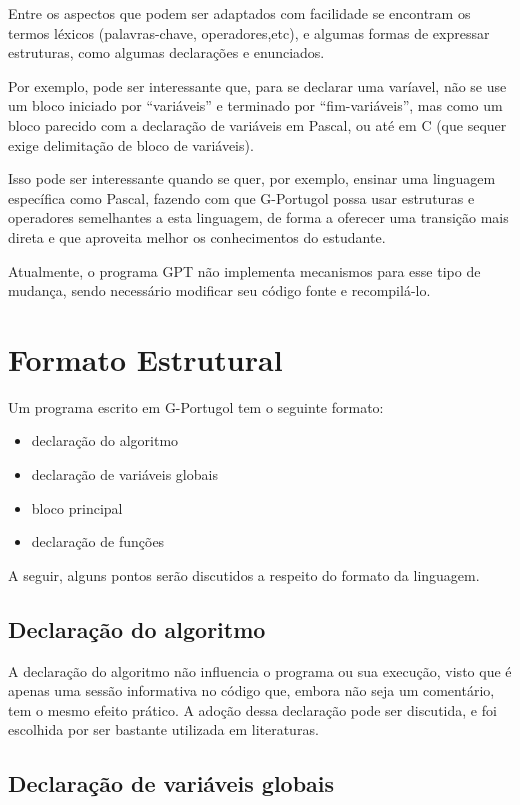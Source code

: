 \documentclass[a4paper,11pt]{report}
\begin{document}
Entre os aspectos que podem ser adaptados com facilidade se encontram os termos
léxicos (palavras-chave, operadores,etc), e algumas formas de expressar
estruturas, como algumas declarações e enunciados.

Por exemplo, pode ser interessante que, para se declarar uma varíavel, não se
use um bloco iniciado por ``variáveis'' e terminado por ``fim-variáveis'', mas
como um bloco parecido com a declaração de variáveis em Pascal, ou até em C (que
sequer exige delimitação de bloco de variáveis).

Isso pode ser interessante quando se quer, por exemplo, ensinar uma linguagem
específica como Pascal, fazendo com que G-Portugol possa usar estruturas e
operadores semelhantes a esta linguagem, de forma a oferecer uma transição mais
direta e que aproveita melhor os conhecimentos do estudante.

Atualmente, o programa GPT não implementa mecanismos para esse tipo de mudança,
sendo necessário modificar seu código fonte e recompilá-lo.

\section{Formato Estrutural}

Um programa escrito em G-Portugol tem o seguinte formato:

\begin{itemize}
  \item declaração do algoritmo
  \item declaração de variáveis globais
  \item bloco principal
  \item declaração de funções
\end{itemize}

  A seguir, alguns pontos serão discutidos a respeito do formato da linguagem.

\subsection{Declaração do algoritmo}

A declaração do algoritmo não influencia o programa ou sua execução, visto que é
apenas uma sessão informativa no código que, embora não seja um comentário, tem
o mesmo efeito prático. A adoção dessa declaração pode ser discutida, e foi
escolhida por ser bastante utilizada em literaturas.

\subsection{Declaração de variáveis globais}
\end{document}
